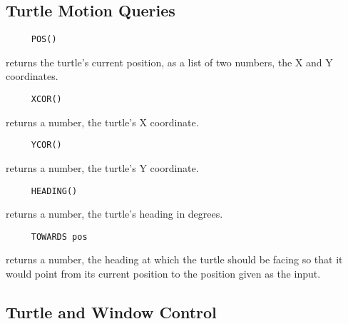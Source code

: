 

\subsection{Turtle Motion Queries}

\begin{verbatim}
     POS()
\end{verbatim}
returns the turtle's current position, as a list of two numbers, the X
and Y coordinates.

\begin{verbatim}
     XCOR()
\end{verbatim}
returns a number, the turtle's X coordinate.

\begin{verbatim}
     YCOR()
\end{verbatim}
returns a number, the turtle's Y coordinate.

\begin{verbatim}
     HEADING()
\end{verbatim}
returns a number, the turtle's heading in degrees.

\begin{verbatim}
     TOWARDS pos
\end{verbatim}
returns a number, the heading at which the turtle should be facing so
that it would point from its current position to the position given as
the input.




\subsection{Turtle and Window Control}



